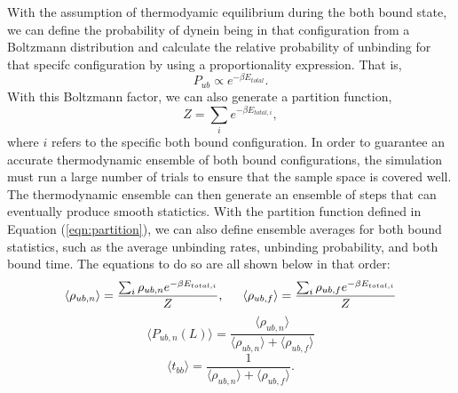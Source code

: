 With the assumption of thermodyamic equilibrium during the both bound state, we can define the probability of dynein being in that configuration from a Boltzmann distribution and calculate the relative probability of unbinding for that specifc configuration by using a proportionality expression. That is, 
\begin{equation}
	P_{ub}\propto e^{-\beta E_{total}}.
\end{equation}
With this Boltzmann factor, we can also generate a partition function, 
\begin{equation} \label{eqn:partition}
	Z=\sum_{i}e^{-\beta E_{total,i}},
\end{equation}
where $i$ refers to the specific both bound configuration. In order to guarantee an accurate thermodynamic ensemble of both bound configurations, the simulation must run a large number of trials to ensure that the sample space is covered well. The thermodynamic ensemble can then generate an ensemble of steps that can eventually produce smooth statictics. With the partition function defined in Equation (\ref{eqn:partition}), we can also define ensemble averages for both bound statistics, such as the average unbinding rates, unbinding probability, and both bound time. The equations to do so are all shown below in that order:
\begin{equation}
	\langle\rho_{ub, n}\rangle=\frac{\sum_{i}\rho_{ub, n} e^{-\beta E_{total,i}}}{Z}, \indent \langle\rho_{ub, f}\rangle=\frac{\sum_{i}\rho_{ub, f} e^{-\beta E_{total,i}}}{Z}
\end{equation}
\begin{equation}
	\langle P_{ub, n}(L)\rangle = \frac{\langle\rho_{ub, n}\rangle}{\langle\rho_{ub, n}\rangle + \langle\rho_{ub, f}\rangle}
\end{equation}
\begin{equation}
	\langle t_{bb} \rangle =\frac{1}{\langle\rho_{ub, n}\rangle + \langle\rho_{ub, f}\rangle}.
\end{equation}





